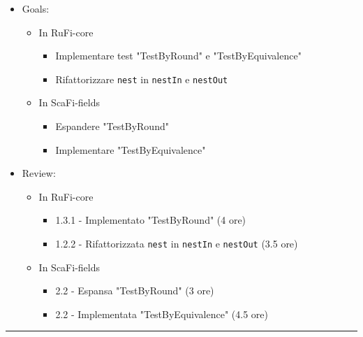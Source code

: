 \documentclass[12pt, a4paper]{article}
\begin{document}
\begin{itemize}
    \item Goals:
          \begin{itemize}
              \color{teal}
              \item In RuFi-core
                    \begin{itemize}
                        \item Implementare test "TestByRound" e "TestByEquivalence"
                        \item Rifattorizzare \texttt{nest} in \texttt{nestIn} e \texttt{nestOut}
                    \end{itemize}
                    \color{blue}

              \item In ScaFi-fields
                    \begin{itemize}
                        \item Espandere "TestByRound"
                        \item Implementare "TestByEquivalence"
                    \end{itemize}
          \end{itemize}
    \item Review:
          \begin{itemize}
              \color{teal}
              \item In RuFi-core
                    \begin{itemize}
                        \item 1.3.1 - Implementato "TestByRound" (4 ore)
                        \item 1.2.2 - Rifattorizzata \texttt{nest} in \texttt{nestIn} e \texttt{nestOut} (3.5 ore)
                    \end{itemize}
                    \color{blue}

              \item In ScaFi-fields
                    \begin{itemize}
                        \item 2.2 - Espansa "TestByRound" (3 ore)
                        \item 2.2 - Implementata "TestByEquivalence" (4.5 ore)
                    \end{itemize}
          \end{itemize}
\end{itemize}

\par\noindent\rule{\textwidth}{0.5pt}
\end{document}
